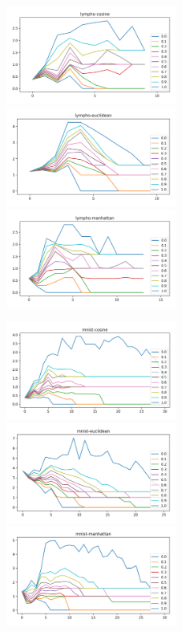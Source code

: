 \begin{figure}[!t]
\centering
\includegraphics[width=2.2in]{kdd/static/lfd_vs_depth/lympho-cosine.png}
\includegraphics[width=2.2in]{kdd/static/lfd_vs_depth/lympho-euclidean.png}
\includegraphics[width=2.2in]{kdd/static/lfd_vs_depth/lympho-manhattan.png}

\includegraphics[width=2.2in]{kdd/static/lfd_vs_depth/mnist-cosine.png}
\includegraphics[width=2.2in]{kdd/static/lfd_vs_depth/mnist-euclidean.png}
\includegraphics[width=2.2in]{kdd/static/lfd_vs_depth/mnist-manhattan.png}


\end{figure}
